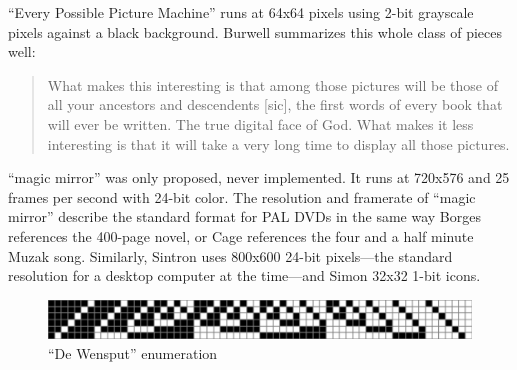 \documentclass{thesis}
\begin{document}
``Every Possible Picture Machine'' runs at 64x64 pixels using 2-bit grayscale pixels against a black background. Burwell summarizes this whole class of pieces well:
	
	\begin{quote}
	What makes this interesting is that among those pictures will be those of all your ancestors and descendents [sic], the first words of every book that will ever be written. The true digital face of God. What makes it less interesting is that it will take a very long time to display all those pictures.
	\end{quote}
	
``magic mirror'' was only proposed, never implemented. It runs at 720x576 and 25 frames per second with 24-bit color. The resolution and framerate of ``magic mirror'' describe the standard format for PAL DVDs in the same way Borges references the 400-page novel, or Cage references the four and a half minute Muzak song. Similarly, Sintron uses 800x600 24-bit pixels---the standard resolution for a desktop computer at the time---and Simon 32x32 1-bit icons.
	
\begin{figure}
	\begin{center}
		\includegraphics[scale=.8]{graphics/dewensput-bitmap.pdf}
		\caption{``De Wensput'' enumeration}
		\label{dewensput-bitmap}
	\end{center}
\end{figure}
\end{document}
